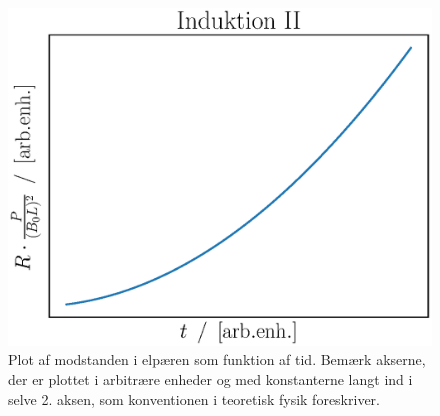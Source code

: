 \begin{figure}
    \centering
    \includegraphics[width=.6\columnwidth]{facit/figurer/opg_induktion_ii.eps}
    \caption{Plot af modstanden i elpæren som funktion af tid. Bemærk akserne, der er plottet i arbitrære enheder og med konstanterne langt ind i selve 2. aksen, som konventionen i teoretisk fysik foreskriver.}
    \label{fig:plot_induktion_ii}
\end{figure}